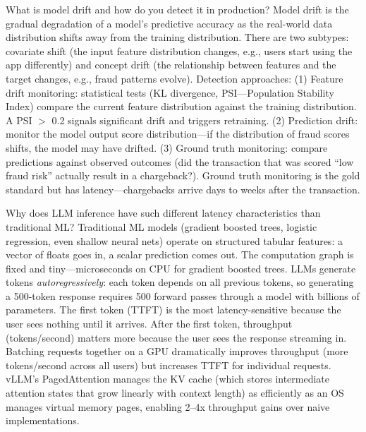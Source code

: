 \documentclass[11pt,a4paper]{article}
\begin{document}
\begin{curiobox}{What is model drift and how do you detect it in production?}
Model drift is the gradual degradation of a model's predictive accuracy as the real-world data distribution shifts away from the training distribution. There are two subtypes: covariate shift (the input feature distribution changes, e.g., users start using the app differently) and concept drift (the relationship between features and the target changes, e.g., fraud patterns evolve). Detection approaches: (1) Feature drift monitoring: statistical tests (KL divergence, PSI---Population Stability Index) compare the current feature distribution against the training distribution. A PSI $>$ 0.2 signals significant drift and triggers retraining. (2) Prediction drift: monitor the model output score distribution---if the distribution of fraud scores shifts, the model may have drifted. (3) Ground truth monitoring: compare predictions against observed outcomes (did the transaction that was scored ``low fraud risk'' actually result in a chargeback?). Ground truth monitoring is the gold standard but has latency---chargebacks arrive days to weeks after the transaction.
\end{curiobox}

\begin{curiobox}{Why does LLM inference have such different latency characteristics than traditional ML?}
Traditional ML models (gradient boosted trees, logistic regression, even shallow neural nets) operate on structured tabular features: a vector of floats goes in, a scalar prediction comes out. The computation graph is fixed and tiny---microseconds on CPU for gradient boosted trees. LLMs generate tokens \textit{autoregressively}: each token depends on all previous tokens, so generating a 500-token response requires 500 forward passes through a model with billions of parameters. The first token (TTFT) is the most latency-sensitive because the user sees nothing until it arrives. After the first token, throughput (tokens/second) matters more because the user sees the response streaming in. Batching requests together on a GPU dramatically improves throughput (more tokens/second across all users) but increases TTFT for individual requests. vLLM's PagedAttention manages the KV cache (which stores intermediate attention states that grow linearly with context length) as efficiently as an OS manages virtual memory pages, enabling 2--4x throughput gains over naive implementations.
\end{curiobox}
\end{document}
